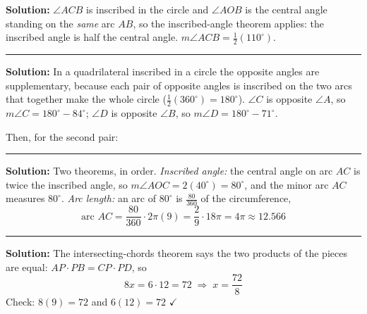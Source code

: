 \documentclass[12pt]{article}
\begin{document}




\textbf{Solution:} $\angle ACB$ is inscribed in the circle and $\angle AOB$ is the
central angle standing on the \emph{same} arc $AB$, so the inscribed-angle theorem
applies: the inscribed angle is half the central angle.
$m\angle ACB = \tfrac{1}{2}(110^\circ)$.

\vspace{0.2cm}\noindent\rule{\linewidth}{0.2pt}


\textbf{Solution:} In a quadrilateral inscribed in a circle the opposite angles are
supplementary, because each pair of opposite angles is inscribed on the two arcs
that together make the whole circle ($\tfrac{1}{2}(360^\circ) = 180^\circ$).
$\angle C$ is opposite $\angle A$, so $m\angle C = 180^\circ - 84^\circ$; $\angle D$
is opposite $\angle B$, so $m\angle D = 180^\circ - 71^\circ$.

Then, for the second pair:

\vspace{0.2cm}\noindent\rule{\linewidth}{0.2pt}


\textbf{Solution:} Two theorems, in order.
\emph{Inscribed angle:} the central angle on arc $AC$ is twice the inscribed angle,
so $m\angle AOC = 2(40^\circ) = 80^\circ$, and the minor arc $AC$ measures $80^\circ$.
\emph{Arc length:} an arc of $80^\circ$ is $\tfrac{80}{360}$ of the circumference,
\[
  \text{arc } AC = \frac{80}{360}\cdot 2\pi(9) = \frac{2}{9}\cdot 18\pi = 4\pi \approx 12.566
\]

\vspace{0.2cm}\noindent\rule{\linewidth}{0.2pt}


\textbf{Solution:} The intersecting-chords theorem says the two products of the
pieces are equal: $AP \cdot PB = CP \cdot PD$, so
\[ 8x = 6 \cdot 12 = 72 \;\Longrightarrow\; x = \frac{72}{8} \]
Check: $8(9) = 72$ and $6(12) = 72$ $\checkmark$
\end{document}
